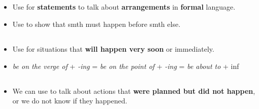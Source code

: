 \subsection{}
\begin{itemize}
    \item[\doot] Use 
    for \textbf{statements} to talk about \textbf{arrangements} in \textbf{formal} language.
    \item[\doot] Use 
    to show that smth must happen before smth else.
\end{itemize}

\subsection{}
\begin{itemize}
    \item[\doot] Use 
    for situations that \textbf{will happen very soon} or immediately.
    \item[\doot] \textit{be on the verge of} + \textit{-ing} =
    \textit{be on the point of} + \textit{-ing} = \textit{be about to} + inf
\end{itemize}

\subsection{}
\begin{itemize}
    \item[\doot] We can use  to talk about actions
    that \textbf{were planned but did not happen}, or we do not know if they happened.
\end{itemize}

